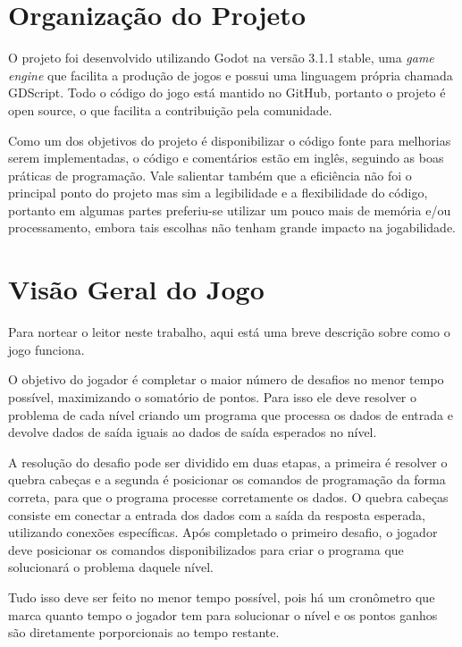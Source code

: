 \section{Organização do Projeto}
\label{sec:consideracoes_preliminares}

O projeto foi desenvolvido utilizando Godot na versão 3.1.1 stable, 
uma \textit{game engine} que facilita a produção de jogos e possui uma linguagem
própria chamada GDScript.
Todo o código do jogo está mantido no GitHub, portanto o projeto é open source,
o que facilita a contribuição pela comunidade.

Como um dos objetivos do projeto é disponibilizar o código fonte para
melhorias serem implementadas, o código e comentários estão em inglês, seguindo
as boas práticas de programação. Vale salientar também que a eficiência não foi
o principal ponto do projeto mas sim a legibilidade e a flexibilidade do 
código, portanto em algumas partes preferiu-se utilizar um pouco mais de memória
e/ou processamento, embora tais escolhas não tenham grande impacto na 
jogabilidade.

\section{Visão Geral do Jogo}
\label{sec:consideracoes_preliminares}

Para nortear o leitor neste trabalho, aqui está uma breve descrição sobre como o
jogo funciona.

O objetivo do jogador é completar o maior número de desafios no menor tempo
possível, maximizando o somatório de pontos. Para isso ele deve resolver o 
problema de cada nível criando um programa que processa os dados de entrada e 
devolve dados de saída iguais ao dados de saída esperados no nível.

A resolução do desafio pode ser dividido em duas etapas, a primeira é resolver 
o quebra cabeças e a segunda é posicionar os comandos de programação da forma 
correta, para que o programa processe corretamente os dados. O quebra cabeças 
consiste em conectar a entrada dos dados com a saída da resposta esperada, 
utilizando conexões específicas. 
Após completado o primeiro desafio, o jogador deve posicionar os comandos
disponibilizados para criar o programa que solucionará o problema daquele nível.

Tudo isso deve ser feito no menor tempo possível, pois há um cronômetro que 
marca quanto tempo o jogador tem para solucionar o nível e os pontos ganhos são 
diretamente porporcionais ao tempo restante.

